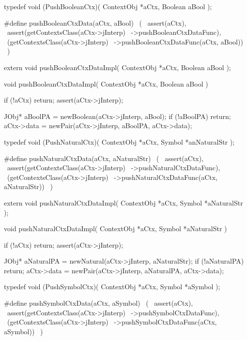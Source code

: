 \startCHeader
typedef void (PushBooleanCtx)(
  ContextObj *aCtx,
  Boolean     aBool
);

#define pushBooleanCtxData(aCtx, aBool)      \
  (                                          \
    assert(aCtx),                            \
    assert(getContextsClass(aCtx->jInterp)   \
      ->pushBooleanCtxDataFunc),             \
    (getContextsClass(aCtx->jInterp)         \
      ->pushBooleanCtxDataFunc(aCtx, aBool)) \
  )
\stopCHeader

\setCHeaderStream{private}
\startCHeader
extern void pushBooleanCtxDataImpl(
  ContextObj *aCtx,
  Boolean     aBool
);
\stopCHeader
\setCHeaderStream{public}

\startCCode
void pushBooleanCtxDataImpl(
  ContextObj *aCtx,
  Boolean     aBool
) {
  if (!aCtx) return;
  assert(aCtx->jInterp);

  JObj* aBoolPA = newBoolean(aCtx->jInterp, aBool);
  if (!aBoolPA) return;
  aCtx->data = newPair(aCtx->jInterp, aBoolPA, aCtx->data);
}
\stopCCode

\startCHeader
typedef void (PushNaturalCtx)(
  ContextObj *aCtx,
  Symbol     *anNaturalStr
);

#define pushNaturalCtxData(aCtx, aNaturalStr)      \
  (                                                \
    assert(aCtx),                                  \
    assert(getContextsClass(aCtx->jInterp)         \
      ->pushNaturalCtxDataFunc),                   \
    (getContextsClass(aCtx->jInterp)               \
      ->pushNaturalCtxDataFunc(aCtx, aNaturalStr)) \
  )
\stopCHeader

\startCHeader
extern void pushNaturalCtxDataImpl(
  ContextObj *aCtx,
  Symbol     *aNaturalStr
);
\stopCHeader
\setCHeaderStream{public}

\startCCode
void pushNaturalCtxDataImpl(
  ContextObj *aCtx,
  Symbol     *aNaturalStr
) {
  if (!aCtx) return;
  assert(aCtx->jInterp);

  JObj* aNaturalPA = newNatural(aCtx->jInterp, aNaturalStr);
  if (!aNaturalPA) return;
  aCtx->data = newPair(aCtx->jInterp, aNaturalPA, aCtx->data);
}
\stopCCode

\startCHeader
typedef void (PushSymbolCtx)(
  ContextObj *aCtx,
  Symbol     *aSymbol
);

#define pushSymbolCtxData(aCtx, aSymbol)      \
  (                                           \
    assert(aCtx),                             \
    assert(getContextsClass(aCtx->jInterp)    \
      ->pushSymbolCtxDataFunc),               \
    (getContextsClass(aCtx->jInterp)          \
      ->pushSymbolCtxDataFunc(aCtx, aSymbol)) \
  )
\stopCHeader

